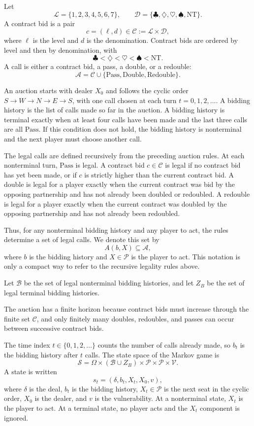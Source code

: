 \documentclass[11pt]{article}
\begin{document}
Let
\[
    \mathcal{L}=\{1,2,3,4,5,6,7\}, \qquad
    \mathcal{D}=\{\clubsuit,\diamondsuit,\heartsuit,\spadesuit,\mathrm{NT}\}.
\]
A contract bid is a pair
\[
    c=(\ell,d)\in \mathcal{C}:=\mathcal{L}\times\mathcal{D},
\]
where $\ell$ is the level and $d$ is the denomination. Contract bids are ordered by level and then by denomination, with
\[
    \clubsuit < \diamondsuit < \heartsuit < \spadesuit < \mathrm{NT}.
\]
A call is either a contract bid, a pass, a double, or a redouble:
\[
    \mathcal{A}=\mathcal{C}\cup\{\mathrm{Pass},\mathrm{Double},\mathrm{Redouble}\}.
\]

An auction starts with dealer $X_0$ and follows the cyclic order $S\to W\to N\to E\to S$, with one call chosen at each turn $t=0,1,2,\ldots$. A bidding history is the list of calls made so far in the auction. A bidding history is terminal exactly when at least four calls have been made and the last three calls are all $\mathrm{Pass}$. If this condition does not hold, the bidding history is nonterminal and the next player must choose another call.

The legal calls are defined recursively from the preceding auction rules. At each nonterminal turn, $\mathrm{Pass}$ is legal. A contract bid $c\in\mathcal{C}$ is legal if no contract bid has yet been made, or if $c$ is strictly higher than the current contract bid. A double is legal for a player exactly when the current contract was bid by the opposing partnership and has not already been doubled or redoubled. A redouble is legal for a player exactly when the current contract was doubled by the opposing partnership and has not already been redoubled.

Thus, for any nonterminal bidding history and any player to act, the rules determine a set of legal calls. We denote this set by
\[
    A(b,X)\subseteq\mathcal{A},
\]
where $b$ is the bidding history and $X\in\mathcal{P}$ is the player to act. This notation is only a compact way to refer to the recursive legality rules above.

Let $\mathcal{B}$ be the set of legal nonterminal bidding histories, and let $Z_B$ be the set of legal terminal bidding histories.

The auction has a finite horizon because contract bids must increase through the finite set $\mathcal{C}$, and only finitely many doubles, redoubles, and passes can occur between successive contract bids.

The time index $t\in\{0,1,2,\ldots\}$ counts the number of calls already made, so $b_t$ is the bidding history after $t$ calls. The state space of the Markov game is
\[
    \mathcal{S}=\Omega\times(\mathcal{B}\cup Z_B)\times\mathcal{P}\times\mathcal{P}\times\mathcal{V}.
\]
A state is written
\[
    s_t=(\delta,b_t,X_t,X_0,v),
\]
where $\delta$ is the deal, $b_t$ is the bidding history, $X_t\in\mathcal{P}$ is the next seat in the cyclic order, $X_0$ is the dealer, and $v$ is the vulnerability. At a nonterminal state, $X_t$ is the player to act. At a terminal state, no player acts and the $X_t$ component is ignored.
\end{document}
